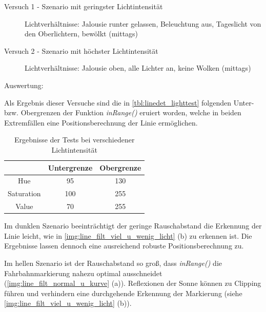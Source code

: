 \documentclass[12pt, a4paper]{scrartcl}
\begin{document}
\begin{description}
	\item[Versuch 1 - Szenario mit geringster Lichtintensität]
	Lichtverhältnisse:	Jalousie runter gelassen, Beleuchtung aus, Tageslicht von den Oberlichtern, bewölkt (mittags)
	\item[Versuch 2 - Szenario mit höchster Lichtintensität]
	Lichtverhältnisse:	Jalousie oben, alle Lichter an, keine Wolken (mittags) 
\end{description}

Auswertung:

Als Ergebnis dieser Versuche sind die in \autoref{tbl:linedet_lighttest} folgenden Unter- bzw. Obergrenzen der Funktion \emph{inRange()} eruiert worden, welche in beiden Extremfällen eine Positionsberechnung der Linie ermöglichen.

\begin{table}[h]
	\caption{Ergebnisse der Tests bei verschiedener Lichtintensität}
	\centering
	\begin{tabular}{ c | c | c |}
		& Untergrenze & Obergrenze \\ \hline
		Hue & 95 & 130 \\ \hline
		Saturation & 100 & 255 \\ \hline
		Value & 70 & 255 \\
	\end{tabular}
	\label{tbl:linedet_lighttest}
\end{table}

Im dunklen Szenario beeinträchtigt der geringe Rauschabstand die Erkennung der Linie leicht, wie in \autoref{img:line_filt_viel_u_wenig_licht} (b) zu erkennen ist. Die Ergebnisse lassen dennoch eine ausreichend robuste Positionsberechnung zu.

Im hellen Szenario ist der Rauschabstand so groß, dass \emph{inRange()} die Fahrbahnmarkierung nahezu optimal ausschneidet (\autoref{img:line_filt_normal_u_kurve} (a)). Reflexionen der Sonne können zu Clipping führen und verhindern eine durchgehende Erkennung der Markierung (siehe \autoref{img:line_filt_viel_u_wenig_licht} (b)).
\end{document}
